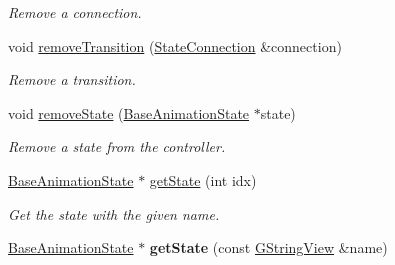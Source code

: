 \begin{Indent}
\begin{DoxyCompactItemize}
\begin{DoxyCompactList}\small\item\em Remove a connection. \end{DoxyCompactList}\item 
\mbox{\label{classrev_1_1_animation_state_machine_a7f86d0c8ea651d4039561362f463881f}} 
void \mbox{\hyperlink{classrev_1_1_animation_state_machine_a7f86d0c8ea651d4039561362f463881f}{remove\+Transition}} (\mbox{\hyperlink{classrev_1_1_state_connection}{State\+Connection}} \&connection)
\begin{DoxyCompactList}\small\item\em Remove a transition. \end{DoxyCompactList}\item 
\mbox{\label{classrev_1_1_animation_state_machine_aac51f5eb7e5c6d5c6f3546b4e9ff4c11}} 
void \mbox{\hyperlink{classrev_1_1_animation_state_machine_aac51f5eb7e5c6d5c6f3546b4e9ff4c11}{remove\+State}} (\mbox{\hyperlink{classrev_1_1_base_animation_state}{Base\+Animation\+State}} $\ast$state)
\begin{DoxyCompactList}\small\item\em Remove a state from the controller. \end{DoxyCompactList}\item 
\mbox{\label{classrev_1_1_animation_state_machine_af9d019b892ee39389acdf694eba05f95}} 
\mbox{\hyperlink{classrev_1_1_base_animation_state}{Base\+Animation\+State}} $\ast$ \mbox{\hyperlink{classrev_1_1_animation_state_machine_af9d019b892ee39389acdf694eba05f95}{get\+State}} (int idx)
\begin{DoxyCompactList}\small\item\em Get the state with the given name. \end{DoxyCompactList}\item 
\mbox{\label{classrev_1_1_animation_state_machine_adb22a1bb3d91d1cec158e9946deabf6d}} 
\mbox{\hyperlink{classrev_1_1_base_animation_state}{Base\+Animation\+State}} $\ast$ {\bfseries get\+State} (const \mbox{\hyperlink{classrev_1_1_g_string_view}{G\+String\+View}} \&name)
\item 
\mbox{\label{classrev_1_1_animation_state_machine_af53c81cabf17181931d2cdb22d411164}} 

\end{DoxyCompactItemize}
\end{Indent}
